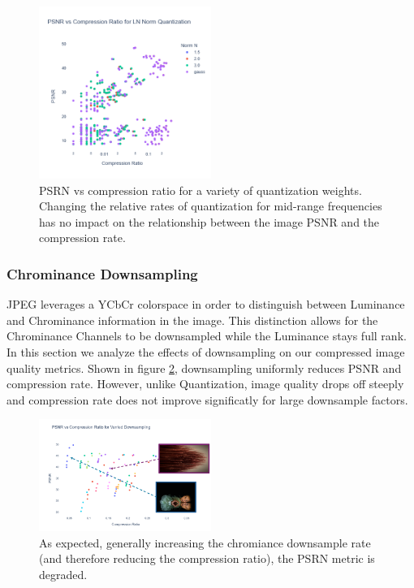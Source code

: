 \begin{figure}
    \includegraphics[width=0.5\textwidth]{assets/PSNR for LN Quantization with gaussian weights.png}
    \caption{PSRN vs compression ratio for a variety of quantization weights. Changing the relative rates of quantization for mid-range frequencies has no impact on the relationship between the image PSNR and the compression rate.}
    \label{fig:LN-norm_quantization_performance}
\end{figure}

\subsubsection{Chrominance Downsampling}

JPEG leverages a YCbCr colorspace in order to distinguish between Luminance and Chrominance information in the image.
This distinction allows for the Chrominance Channels to be downsampled while the Luminance stays full rank.
In this section we analyze the effects of downsampling on our compressed image quality metrics. 
Shown in figure \ref{fig:downsample_vs_psnr}, downsampling uniformly reduces PSNR and compression rate. However, unlike Quantization, image quality drops off steeply and compression rate does not improve significatly for large downsample factors.

\begin{figure}
    \includegraphics[width=0.5\textwidth]{assets/PSNR vs Chromiance Downsampling with Images.png}
    \caption{As expected, generally increasing the chromiance downsample rate (and therefore reducing the compression ratio), the PSRN metric is degraded.}
    \label{fig:downsample_vs_psnr}
\end{figure}

